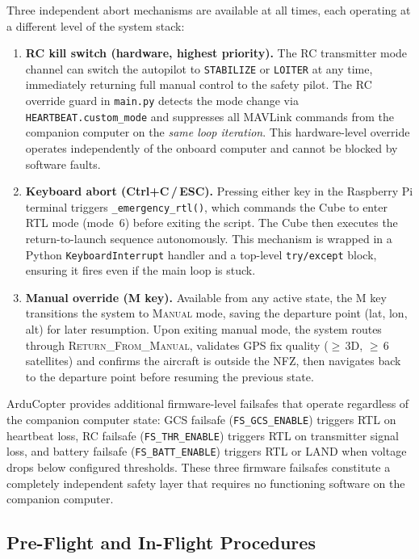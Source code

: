 Three independent abort mechanisms are available at all times, each operating at a different level of the system stack:

\begin{enumerate}
    \item \textbf{RC kill switch (hardware, highest priority).} The RC transmitter mode channel can switch the autopilot to \texttt{STABILIZE} or \texttt{LOITER} at any time, immediately returning full manual control to the safety pilot. The RC override guard in \texttt{main.py} detects the mode change via \texttt{HEARTBEAT.custom\_mode} and suppresses all MAVLink commands from the companion computer on the \emph{same loop iteration}. This hardware-level override operates independently of the onboard computer and cannot be blocked by software faults.

    \item \textbf{Keyboard abort (Ctrl+C\,/\,ESC).} Pressing either key in the Raspberry Pi terminal triggers \texttt{\_emergency\_rtl()}, which commands the Cube to enter RTL mode (mode~6) before exiting the script. The Cube then executes the return-to-launch sequence autonomously. This mechanism is wrapped in a Python \texttt{KeyboardInterrupt} handler and a top-level \texttt{try/except} block, ensuring it fires even if the main loop is stuck.

    \item \textbf{Manual override (M key).} Available from any active state, the M key transitions the system to \textsc{Manual} mode, saving the departure point (lat, lon, alt) for later resumption. Upon exiting manual mode, the system routes through \textsc{Return\_From\_Manual}, validates GPS fix quality ($\geq$\,3D, $\geq$\,6 satellites) and confirms the aircraft is outside the NFZ, then navigates back to the departure point before resuming the previous state.
\end{enumerate}

ArduCopter provides additional firmware-level failsafes that operate regardless of the companion computer state: GCS failsafe (\texttt{FS\_GCS\_ENABLE}) triggers RTL on heartbeat loss, RC failsafe (\texttt{FS\_THR\_ENABLE}) triggers RTL on transmitter signal loss, and battery failsafe (\texttt{FS\_BATT\_ENABLE}) triggers RTL or LAND when voltage drops below configured thresholds. These three firmware failsafes constitute a completely independent safety layer that requires no functioning software on the companion computer.

\subsection{Pre-Flight and In-Flight Procedures}\label{sec:procedures}

